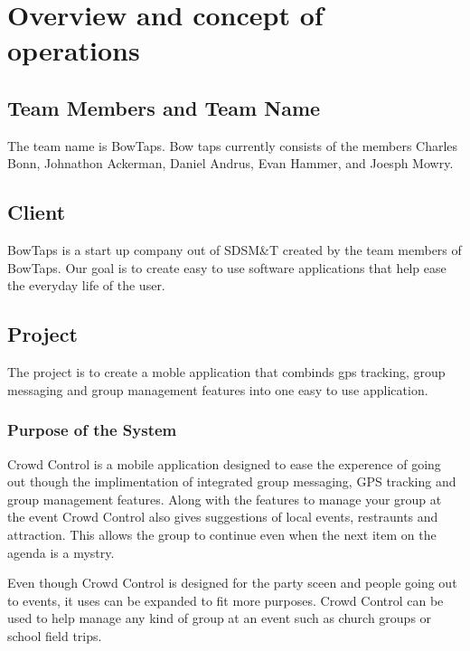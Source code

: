 

\chapter{Overview and concept of operations}


\section{Team Members and Team Name}

The team name is BowTaps. Bow taps currently consists of the members Charles Bonn, Johnathon Ackerman, Daniel Andrus, Evan Hammer, and Joesph Mowry.

\section{Client}
BowTaps is a start up company out of SDSM\&T created by the team members of BowTaps. Our goal is to create easy to use software applications that help ease the everyday life of the user.

\section{Project}
The project is to create a moble application that combinds gps tracking, group messaging and group management features into one easy to use application.

\subsection{Purpose of the System}
Crowd Control is a mobile application designed to ease the experence of going out though the implimentation of integrated group messaging, GPS tracking and group management features. Along with the features to manage your group at the event Crowd Control also gives suggestions of local events, restraunts and attraction. This allows the group to continue even when the next item on the agenda is a mystry. 


Even though Crowd Control is designed for the party sceen and people going out to events, it uses can be expanded to fit more purposes. Crowd Control can be used to help manage any kind of group at an event such as church groups or school field trips.

